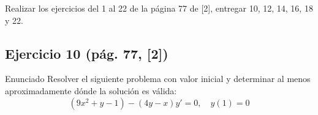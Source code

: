 \newpage


 Realizar los ejercicios del 1 al 22 de la página 77 de [2], entregar
10, 12, 14, 16, 18 y 22.

\subsection*{Ejercicio 10 \quad\normalfont\small(pág. 77, [2])}

\begin{enunciado}{Enunciado}
    Resolver el siguiente problema con valor inicial y determinar 
    al menos aproximadamente dónde la solución es válida:
    \[
        (9x^2 + y - 1) - (4y - x)y' = 0, \quad y(1) = 0
    \]
\end{enunciado}

